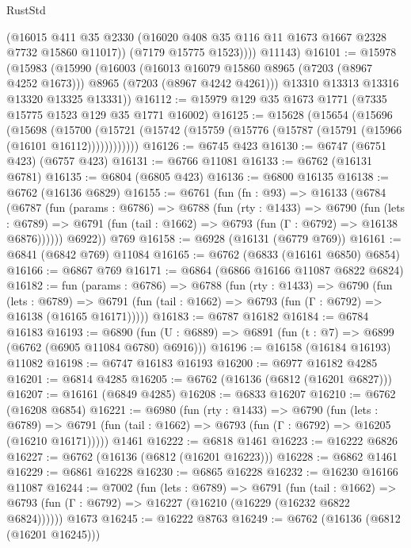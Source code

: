 \begin{lexlean}{RustStd}
\begin{coremodule}
            (@16015 @411 @35 @2330 (@16020 @408 @35 @116 @11 @1673 @1667 @2328 @7732 @15860 @11017))
            (@7179 @15775 @1523))))
      @11143)
@16101 := @15978
    (@15983
      (@15990
        (@16003
          (@16013 @16079 @15860 @8965 (@7203 (@8967 @4252 @1673)))
          @8965
          (@7203 (@8967 @4242 @4261)))
        @13310
        @13313
        @13316
        @13320
        @13325
        @13331))
@16112 := @15979 @129 @35 @1673 @1771 (@7335 @15775 @1523 @129 @35 @1771 @16002)
@16125 := @15628
    (@15654
      (@15696
        (@15698
          (@15700 (@15721 (@15742 (@15759 (@15776 (@15787 (@15791 (@15966 (@16101 @16112))))))))))))
@16126 := @6745 @423
@16130 := @6747 (@6751 @423) (@6757 @423)
@16131 := @6766 @11081
@16133 := @6762 (@16131 @6781)
@16135 := @6804 (@6805 @423)
@16136 := @6800 @16135
@16138 := @6762 (@16136 @6829)
@16155 := @6761
    (fun (fn : @93) =>
    @16133
      (@6784
        (@6787
          (fun (params : @6786) =>
          @6788
            (fun (rty : @1433) =>
            @6790
              (fun (lets : @6789) =>
              @6791 (fun (tail : @1662) => @6793 (fun (Γ : @6792) => @16138 @6876))))))
        @6922))
    @769
@16158 := @6928 (@16131 (@6779 @769))
@16161 := @6841 (@6842 @769) @11084
@16165 := @6762 (@6833 (@16161 @6850) @6854)
@16166 := @6867 @769
@16171 := @6864 (@6866 @16166 @11087 @6822 @6824)
@16182 := fun (params : @6786) =>
  @6788
    (fun (rty : @1433) =>
    @6790
      (fun (lets : @6789) =>
      @6791 (fun (tail : @1662) => @6793 (fun (Γ : @6792) => @16138 (@16165 @16171)))))
@16183 := @6787 @16182
@16184 := @6784 @16183
@16193 := @6890
    (fun (U : @6889) => @6891 (fun (t : @7) => @6899 (@6762 (@6905 @11084 @6780) @6916)))
@16196 := @16158 (@16184 @16193) @11082
@16198 := @6747 @16183 @16193
@16200 := @6977 @16182 @4285
@16201 := @6814 @4285
@16205 := @6762 (@16136 (@6812 (@16201 @6827)))
@16207 := @16161 (@6849 @4285)
@16208 := @6833 @16207
@16210 := @6762 (@16208 @6854)
@16221 := @6980
    (fun (rty : @1433) =>
    @6790
      (fun (lets : @6789) =>
      @6791 (fun (tail : @1662) => @6793 (fun (Γ : @6792) => @16205 (@16210 @16171)))))
    @1461
@16222 := @6818 @1461
@16223 := @16222 @6826
@16227 := @6762 (@16136 (@6812 (@16201 @16223)))
@16228 := @6862 @1461
@16229 := @6861 @16228
@16230 := @6865 @16228
@16232 := @16230 @16166 @11087
@16244 := @7002
    (fun (lets : @6789) =>
    @6791
      (fun (tail : @1662) =>
      @6793 (fun (Γ : @6792) => @16227 (@16210 (@16229 (@16232 @6822 @6824))))))
    @1673
@16245 := @16222 @8763
@16249 := @6762 (@16136 (@6812 (@16201 @16245)))

\end{coremodule}
\end{lexlean}
